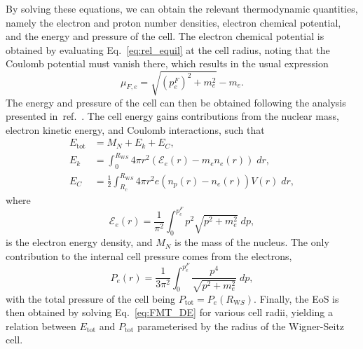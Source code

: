 By solving these equations, we can obtain the relevant thermodynamic quantities, namely the electron and proton number densities, electron chemical potential, and the energy and pressure of the cell. The electron chemical potential is obtained by evaluating Eq.~\ref{eq:rel_equil} at the cell radius, noting that the Coulomb potential must vanish there, which results in the usual expression
\begin{equation}
    \mu_{F,e} = \sqrt{(p_e^F)^2+m_e^2}-m_e.\label{eq:mufe}
\end{equation}
The energy and pressure of the cell can then be obtained following the analysis presented in~ref.~\cite{Rotondo:2011zz_RelativisticFeynmanMetropolisTellertheory}. The cell energy gains contributions from the nuclear mass, electron kinetic energy, and Coulomb interactions, such that
\begin{align}
    E_\mathrm{tot} & = M_N + E_k + E_C,\\
    E_k & = \int_0^{R_{\mathrm WS}}4\pi r^2 (\mathcal{E}_e(r) - m_e n_e(r))\;dr,\\
    E_C & = \frac{1}{2}\int_{R_c}^{R_{\mathrm WS}}4\pi r^2 e(n_p(r) - n_e(r))V(r)\;dr,
\end{align}
where 
\begin{equation}
    \mathcal{E}_e(r) = \frac{1}{\pi^2}\int_0^{p_e^F}p^2\sqrt{p^2 + m_e^2}\;dp,
\end{equation}
is the electron energy density, and  $M_N$ is the mass of the nucleus. The only contribution to the internal cell pressure comes from the electrons,
\begin{equation}
    P_e(r) = \frac{1}{3\pi^2}\int_0^{p_e^F}\frac{p^4}{\sqrt{p^2+m_e^2}}\;dp,
\end{equation}
with the total pressure of the cell being $P_\mathrm{tot} = P_e(R_{\mathrm WS})$.
Finally, the EoS is then obtained by solving Eq.~\ref{eq:FMT_DE} for various cell radii, yielding a relation between $E_\mathrm{tot}$ and $P_\mathrm{tot}$ parameterised by the radius of the Wigner-Seitz cell. 


